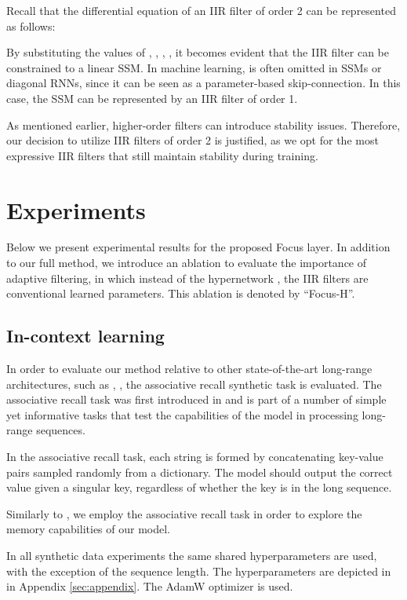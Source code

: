 \documentclass[11pt]{article}
\begin{document}
Recall that the differential equation of an IIR filter of order 2 can be represented as follows:



By substituting the values of , , , , it becomes evident that the IIR filter can be constrained to a linear SSM. In machine learning,  is often omitted in SSMs or diagonal RNNs, since it can be seen as a parameter-based skip-connection. In this case, the SSM can be represented by an IIR filter of order 1.

As mentioned earlier, higher-order filters can introduce stability issues. Therefore, our decision to utilize IIR filters of order 2 is justified, as we opt for the most expressive IIR filters that still maintain stability during training.

\section{Experiments} 

Below we present experimental results for the proposed Focus layer. In addition to our full method, we introduce an ablation to evaluate the importance of adaptive filtering, in which instead of the hypernetwork , the IIR filters are conventional learned parameters. This ablation is denoted by ``Focus-H''.
\subsection{In-context learning}
 In order to evaluate our method relative to other state-of-the-art long-range architectures, such as \cite{poli2023hyena}, \cite{dai2019transformer}, the associative recall synthetic task is evaluated. The associative recall task was first introduced in \cite{elhage2021mathematical} and is part of a number of simple yet informative tasks that test the capabilities of the model in processing long-range sequences.

In the associative recall task, each string is formed by concatenating key-value pairs sampled randomly from a dictionary. The model should output the correct value given a singular key, regardless of whether the key is in the long sequence.

Similarly to \citet{poli2023hyena}, we employ the associative recall task in order to explore the memory capabilities of our model. 

In all synthetic data experiments the same shared hyperparameters are used, with the exception of the sequence length. The hyperparameters are depicted in {in Appendix \ref{sec:appendix}}. The AdamW optimizer \citep{loshchilov2017fixing} is used.
\end{document}
